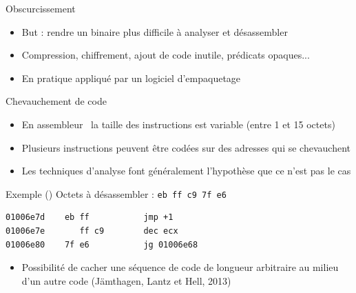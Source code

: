 \documentclass{beamer}
\begin{document}
\begin{frame}{Obscurcissement}
\begin{itemize}
 \item But : rendre un binaire plus difficile à analyser et désassembler
 \item Compression, chiffrement, ajout de code inutile, prédicats opaques...
 \item En pratique appliqué par un logiciel d'empaquetage
\end{itemize}

\begin{center}
\end{center}
\end{frame}


\begin{frame}[fragile]{Chevauchement de code}
\begin{itemize}
 \item En assembleur \xq\ la taille des instructions est variable (entre 1 et 15 octets)
 \item Plusieurs instructions peuvent être codées sur des adresses qui se chevauchent
 \item Les techniques d'analyse font généralement l'hypothèse que ce n'est pas le cas
\end{itemize}

\begin{block}{Exemple (\telock)}
Octets à désassembler : \texttt{eb ff c9 7f e6}
\begin{lstlisting}[language={[x86masm]Assembler}, escapechar=~]
01006e7d    eb ff           jmp +1
01006e7e       ff c9        dec ecx
01006e80    7f e6           jg 01006e68
\end{lstlisting}
\pause
\end{block}
\begin{itemize}
 \item Possibilité de cacher une séquence de code de longueur arbitraire au milieu d'un autre code (Jämthagen, Lantz et Hell, 2013)
\end{itemize}

\end{frame}
\end{document}
